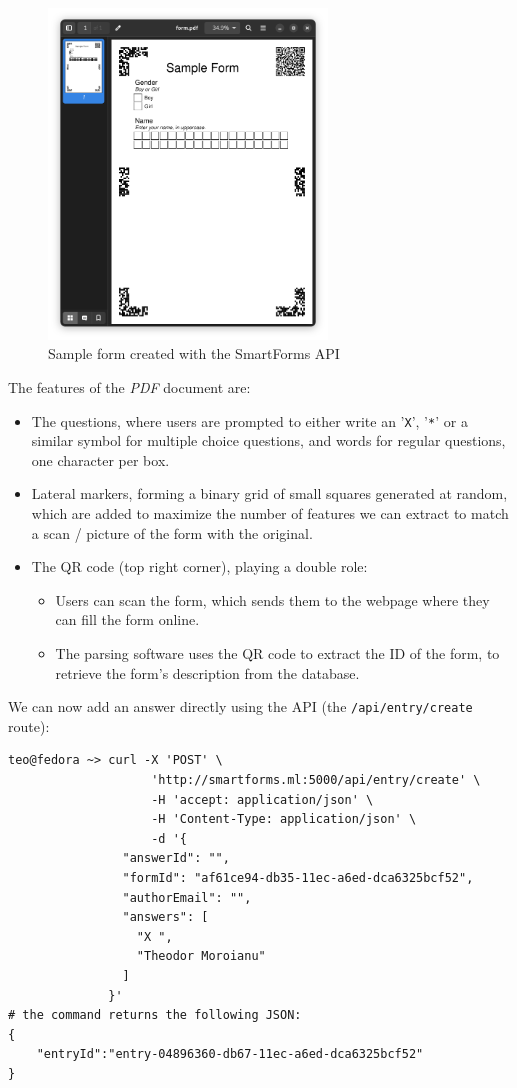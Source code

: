\documentclass[11pt, a4paper]{report}
\def\code#1{\texttt{#1}}
\begin{document}
\begin{figure}[!h]
    \centering
    \includegraphics[width=20em]{images/screenshoots/sample_form.png}
    \caption{Sample form created with the SmartForms API}
    \label{simple-form-preview}
\end{figure}

The features of the \textit{PDF} document are:
\begin{itemize}
    \item The questions, where users are prompted to either write an '\code{X}', '\code{*}' or a similar symbol for multiple choice questions, and words for regular questions, one character per box.
    \item Lateral markers, forming a binary grid of small squares generated at random, which are added to maximize the number of features we can extract to match a scan / picture of the form with the original.
    \item The QR code (top right corner), playing a double role:
    \begin{itemize}
        \item Users can scan the form, which sends them to the webpage where they can fill the form online.
        \item The parsing software uses the QR code to extract the ID of the form, to retrieve the form's description from the database.
    \end{itemize}
\end{itemize}

We can now add an answer directly using the API (the \code{/api/entry/create} route):

\begin{verbatim}
teo@fedora ~> curl -X 'POST' \
                    'http://smartforms.ml:5000/api/entry/create' \
                    -H 'accept: application/json' \
                    -H 'Content-Type: application/json' \
                    -d '{
                "answerId": "",
                "formId": "af61ce94-db35-11ec-a6ed-dca6325bcf52",
                "authorEmail": "",
                "answers": [
                  "X ",
                  "Theodor Moroianu"
                ]
              }'
# the command returns the following JSON:
{
    "entryId":"entry-04896360-db67-11ec-a6ed-dca6325bcf52"
}
\end{verbatim}
\end{document}
